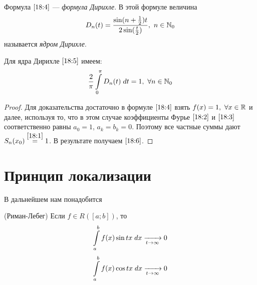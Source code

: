 \documentclass[../../main.tex]{subfiles}
\begin{document}
\begin{rem}
	Формула $\eqref{18:4}$ --- \emph{формула Дирихле}. В этой формуле величина
	\begin{equation}
		\label{18:5}
		D_n(t) = \dfrac{\sin(n+\frac{1}{2})t}{2\sin(\frac{t}{2})},\ 
		n \in \N_0 
	\end{equation}
	называется \emph{ядром Дирихле}.
\end{rem}

\begin{crl*}
	Для ядра Дирихле $\eqref{18:5}$ имеем:
	\begin{equation}
		\label{18:6}
		\dfrac{2}{\pi}\int\limits_{0}^{\pi}{D_n(t)\; dt} = 1,\ \forall
		n \in \mathbb{N}_0
	\end{equation}
\end{crl*}
\begin{proof}
	Для доказательства достаточно в формуле $\eqref{18:4}$ взять
	$f(x) = 1,\ \forall x \in \mathbb{R}$ и далее, используя то, что в этом
	случае коэффициенты Фурье $\eqref{18:2}$ и $\eqref{18:3}$
	соответственно равны $a_0 = 1$, $a_k = b_k = 0$.
	Поэтому все частные суммы дают $S_n(x_0) \stackrel{\eqref{18:1}}= 1$.
	В результате получаем $\eqref{18:6}$.
\end{proof}

\section{Принцип локализации}
В дальнейшем нам понадобится
\begin{lemma}(Риман-Лебег)
	Если $f \in R([a; b])$, то
	\begin{equation}
		\label{18:7}
		\int\limits_{a}^{b}{f(x)\sin{tx}\;dx}
		\xrightarrow[t \rightarrow \infty]{} 0 
	\end{equation}
	\begin{equation}
	\label{18:8}
	\int\limits_{a}^{b}{f(x)\cos{tx}\;dx}
	\xrightarrow[t \rightarrow \infty]{} 0
	\end{equation}
\end{lemma}
\end{document}
